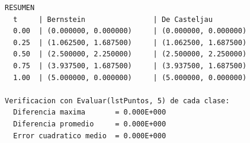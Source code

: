 \begin{lstlisting}[caption={Salida de la validacion manual de la curva cubica.}, label={lst:anx_salida}, basicstyle=\ttfamily\scriptsize]
RESUMEN
  t     | Bernstein                | De Casteljau
  0.00  | (0.000000, 0.000000)     | (0.000000, 0.000000)
  0.25  | (1.062500, 1.687500)     | (1.062500, 1.687500)
  0.50  | (2.500000, 2.250000)     | (2.500000, 2.250000)
  0.75  | (3.937500, 1.687500)     | (3.937500, 1.687500)
  1.00  | (5.000000, 0.000000)     | (5.000000, 0.000000)

Verificacion con Evaluar(lstPuntos, 5) de cada clase:
  Diferencia maxima       = 0.000E+000
  Diferencia promedio     = 0.000E+000
  Error cuadratico medio  = 0.000E+000
\end{lstlisting}

